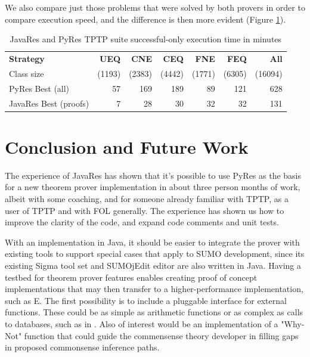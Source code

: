 \documentclass{llncs}
\begin{document}
We also compare just those problems that were solved by both provers in order to compare execution speed,
and the difference is then more evident (Figure \ref{tab:res3}).

\begin{table}[tbh]
  \begin{tabular}{lrrrrrr}
    \hline
    \textbf{Strategy} & \multicolumn{1}{p{4em}}{\hfill{}\textbf{UEQ}}
    & \multicolumn{1}{p{4em}}{\hfill{}\textbf{CNE}}& \multicolumn{1}{p{4em}}{\hfill{}\textbf{CEQ}}
    & \multicolumn{1}{p{4em}}{\hfill{}\textbf{FNE}}& \multicolumn{1}{p{4em}}{\hfill{}\textbf{FEQ}}
    & \multicolumn{1}{p{4em}}{\hfill{}\textbf{All}}\\
    {\tiny Class size}                            & {\tiny (1193)} & {\tiny (2383)} & {\tiny (4442)} & {\tiny (1771)} & {\tiny (6305)} & {\tiny (16094)}\\
    \hline
    PyRes Best (all)                                    &   57 &  169 &   189 &   89 &   121 &  628 \\
    JavaRes Best (proofs)                                 &   7 &   28 &   30 &   32 &   32 &  131 \\
    \hline
  \end{tabular}
  \caption{JavaRes and PyRes TPTP suite successful-only execution time in minutes}
  \label{tab:res3}
\end{table}

\section{Conclusion and Future Work}

The experience of JavaRes has shown that it's possible to use PyRes as the basis for a new theorem
prover implementation in about three person months of work, albeit with some coaching, and for
someone already familiar with TPTP, as a user of TPTP and with FOL generally.  The
experience has shown us how to improve the clarity of the code, and expand code comments and unit
tests.

With an implementation in Java, it should be easier to integrate the prover with existing tools to support
special cases that apply to SUMO development, since its existing Sigma tool set \cite{pease2013sigma}
and SUMOjEdit editor \cite{pease2020programmer} are also written in Java.  Having a testbed for theorem
prover features enables creating proof of concept implementations
that may then transfer to a higher-performance implementation, such as E.  The first possibility is to
include a pluggable interface for external functions.  These could be as simple as arithmetic functions
or as complex as calls to databases, such as in \cite{DBLP:conf/ki/SudaSWLM09}.  Also of interest would be an implementation
of a "Why-Not" function \cite{10.5555/1650083.1650093} that could guide the commensense theory developer in filling gaps
in proposed commonsense inference paths.
\end{document}
